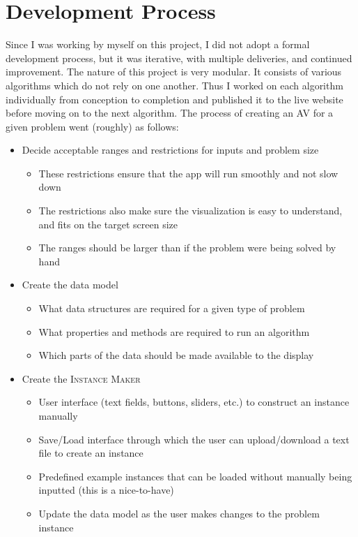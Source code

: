 \chapter{Development Process}
Since I was working by myself on this project, I did not adopt 
a formal development process, but it was iterative, with multiple deliveries, 
and continued improvement. The nature of this project is very modular.
It consists of various algorithms which do not rely on one another.
Thus I worked on each algorithm individually 
from conception to completion and published it to the live website 
before moving on to the next algorithm. 
The process of creating an AV for a given problem went (roughly) as follows:
\begin{itemize}
	\item Decide acceptable ranges and restrictions for inputs and problem size
	\begin{itemize}
		\item These restrictions ensure that the app will run smoothly and not
			slow down
		\item The restrictions also make sure the visualization is 
			easy to understand, and fits on the target screen size
		\item The ranges should be larger than if the problem were being 
			solved by hand
	\end{itemize}
	\item Create the data model
	\begin{itemize}
		\item What data structures are required for a given type of problem
		\item What properties and methods are required to run an algorithm
		\item Which parts of the data should be made available to the display
	\end{itemize}
	\item Create the \textsc{Instance Maker}
	\begin{itemize} 
		\item User interface (text fields, buttons, sliders, etc.) to 
			construct an instance manually
		\item Save/Load interface through which the user can upload/download
			a text file to create an instance
		\item Predefined example instances that can be loaded without 
			manually being inputted (this is a nice-to-have)
		\item Update the data model as the user makes changes to the problem instance

\end{itemize}
\end{itemize}
